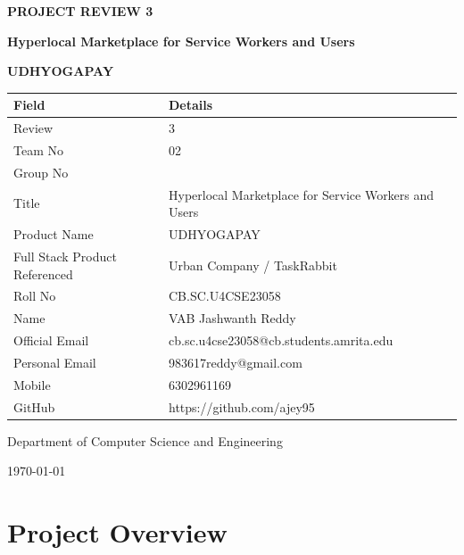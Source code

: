 \documentclass[12pt,a4paper]{article}
\begin{document}
\begin{titlepage}
    \centering
    \vspace*{2cm}
    
    {\Huge\bfseries PROJECT REVIEW 3\par}
    \vspace{1cm}
    {\LARGE\bfseries Hyperlocal Marketplace for Service Workers and Users\par}
    \vspace{0.5cm}
    {\Large\textbf{UDHYOGAPAY}\par}
    
    \vspace{2cm}
    
    \begin{tabular}{|p{5cm}|p{8cm}|}
    \hline
    \rowcolor{lightgray}
    \textbf{Field} & \textbf{Details} \\
    \hline
    Review & 3 \\
    \hline
    Team No & 02 \\
    \hline
    Group No & ~~ \\
    \hline
    Title & Hyperlocal Marketplace for Service Workers and Users \\
    \hline
    Product Name & UDHYOGAPAY \\
    \hline
    Full Stack Product Referenced & Urban Company / TaskRabbit \\
    \hline
    Roll No & CB.SC.U4CSE23058 \\
    \hline
    Name & VAB Jashwanth Reddy \\
    \hline
    Official Email & cb.sc.u4cse23058@cb.students.amrita.edu \\
    \hline
    Personal Email & 983617reddy@gmail.com \\
    \hline
    Mobile & 6302961169 \\
    \hline
    GitHub & https://github.com/ajey95 \\
    \hline
    \end{tabular}
    
    \vfill
    
    {\large Department of Computer Science and Engineering\par}
    {\large \today\par}
\end{titlepage}

\newpage

\section*{Project Overview}
\end{document}
